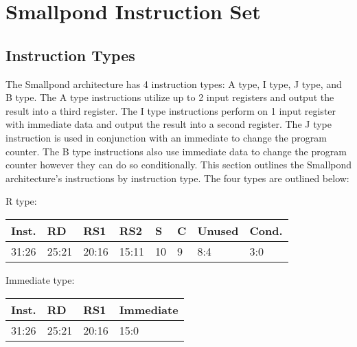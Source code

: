 \documentclass[12pt]{article}
\begin{document}
\newpage
\section{Smallpond Instruction Set}

\subsection{Instruction Types}
    The Smallpond architecture has 4 instruction types: A type, I type, J type, and B type. The A type instructions utilize up to 2 input registers and output the result into a third register. The I type instructions perform on 1 input register with immediate data and output the result into a second register. The J type instruction is used in conjunction with an immediate to change the program counter. The B type instructions also use immediate data to change the program counter however they can do so conditionally. This section outlines the Smallpond architecture's instructions by instruction type. The four types are outlined below:\\

    \begin{center}
        R type:\\
        \vspace{1em}
        \begin{tabular}{ |p{1.8cm}|p{1.5cm}|p{1.5cm}|p{1.5cm}|p{0.3cm}|p{0.3cm}|p{1.5cm}|p{1.5cm}| }
            \hline
            \textbf{Inst.} & \textbf{RD}& \textbf{RS1} & \textbf{RS2} & \textbf{S} & \textbf{C} & Unused & \textbf{Cond.}\\
            \hline
            31:26& 25:21 & 20:16 & 15:11 & 10 & 9 & 8:4 &3:0\\
            \hline
        \end{tabular}
    \end{center}
    
    \begin{center}
        Immediate type:\\
        \vspace{1em}
        \begin{tabular}{ |p{1.8cm}|p{1.5cm}|p{1.5cm}|p{6.8cm}| }
            \hline
            \textbf{Inst.} & \textbf{RD} &  \textbf{RS1} & \textbf{Immediate}\\
            \hline
            31:26& 25:21 & 20:16 &15:0\\
            \hline
        \end{tabular}
    \end{center}
    
\end{document}
